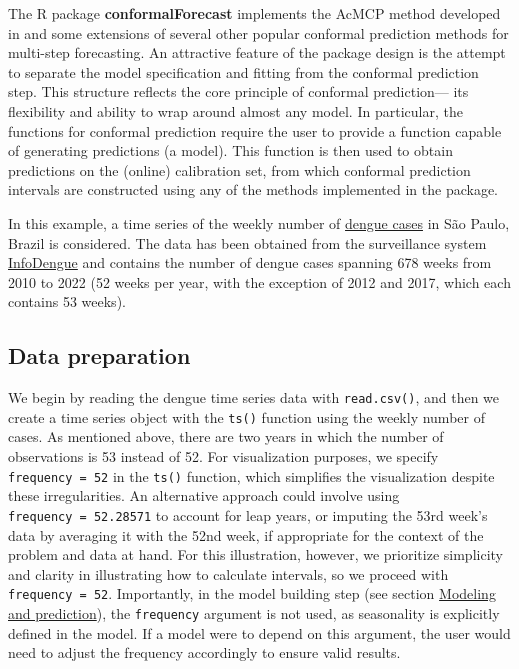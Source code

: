 The R package \textbf{conformalForecast} \citep{conformalForecast} implements the
AcMCP method developed in \citet{Wang_Hyndman_2024} and some extensions of
several other popular conformal prediction methods for multi-step
forecasting. An attractive feature of the package design is the attempt
to separate the model specification and fitting from the conformal
prediction step. This structure reflects the core principle of conformal
prediction--- its flexibility and ability to wrap around almost any
model. In particular, the functions for conformal prediction require the
user to provide a function capable of generating predictions (a model).
This function is then used to obtain predictions on the (online)
calibration set, from which conformal prediction intervals are
constructed using any of the methods implemented in the package.

In this example, a time series of the weekly number of \href{https://github.com/uriel278/tutorials-cp}{dengue
cases} in São Paulo, Brazil is
considered. The data has been obtained from the surveillance system
\href{https://info.dengue.mat.br}{InfoDengue} \citep{codeco2018} and contains the
number of dengue cases spanning 678 weeks from 2010 to 2022 (52 weeks
per year, with the exception of 2012 and 2017, which each contains 53
weeks).

\subsection{Data preparation}\label{data-prep-section}

We begin by reading the dengue time series data with \texttt{read.csv()}, and
then we create a time series object with the \texttt{ts()} function using the
weekly number of cases. As mentioned above, there are two years in which
the number of observations is 53 instead of 52. For visualization
purposes, we specify \texttt{frequency\ =\ 52} in the \texttt{ts()} function, which
simplifies the visualization despite these irregularities. An
alternative approach could involve using \texttt{frequency\ =\ 52.28571} to
account for leap years, or imputing the 53rd week's data by averaging it
with the 52nd week, if appropriate for the context of the problem and
data at hand. For this illustration, however, we prioritize simplicity
and clarity in illustrating how to calculate intervals, so we proceed
with \texttt{frequency\ =\ 52}. Importantly, in the model building step (see
section \hyperref[model-pred-sect]{Modeling and prediction}), the \texttt{frequency}
argument is not used, as seasonality is explicitly defined in the model.
If a model were to depend on this argument, the user would need to
adjust the frequency accordingly to ensure valid results.


